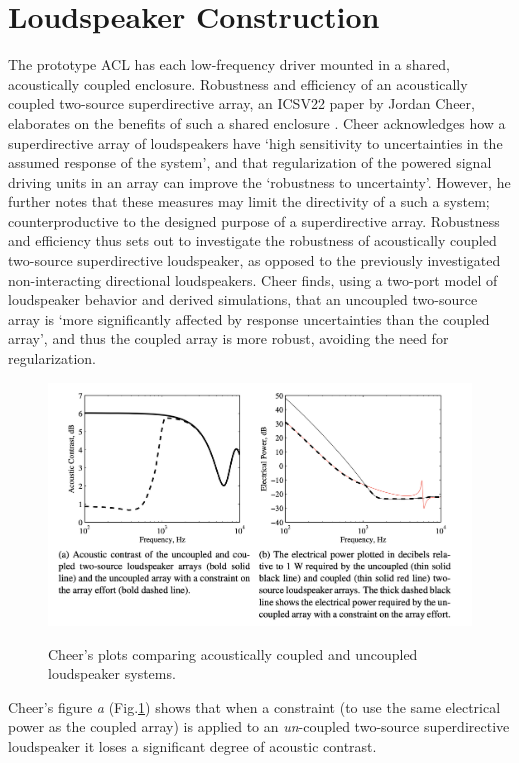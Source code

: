 \documentclass{report}
\begin{document}
    \section{Loudspeaker Construction}
        The prototype ACL has each low-frequency driver mounted in a shared, acoustically coupled enclosure.
        Robustness and efficiency of an acoustically coupled two-source superdirective array, an ICSV22 paper by Jordan Cheer, elaborates on the benefits of such a shared enclosure \cite{cheer2015robustness}.
        Cheer acknowledges how a superdirective array of loudspeakers have `high sensitivity to uncertainties in the assumed response of the system', and that regularization of the powered signal driving units in an array can improve the `robustness to uncertainty'.
        However, he further notes that these measures may limit the directivity of a such a system; counterproductive to the designed purpose of a superdirective array.
        Robustness and efficiency thus sets out to investigate the robustness of acoustically coupled two-source superdirective loudspeaker, as opposed to the previously investigated non-interacting directional loudspeakers.
        Cheer finds, using a two-port model of loudspeaker behavior and derived simulations, that an uncoupled two-source array is `more significantly affected by response uncertainties than the coupled array', and thus the coupled array is more robust, avoiding the need for regularization.
        \begin{figure}[H]
            \centering
            \includegraphics[scale=0.5]{figs/cheerGraph.png}%
            \caption{Cheer's plots comparing acoustically coupled and uncoupled loudspeaker systems.}\cite{cheer2015robustness}
            \label{cheerGraph}
        \end{figure}
        Cheer's figure \textit{a} (Fig.\ref{cheerGraph}) shows that when a constraint (to use the same electrical power as the coupled array) is applied to an \textit{un}-coupled two-source superdirective loudspeaker it loses a significant degree of acoustic contrast.
\end{document}
